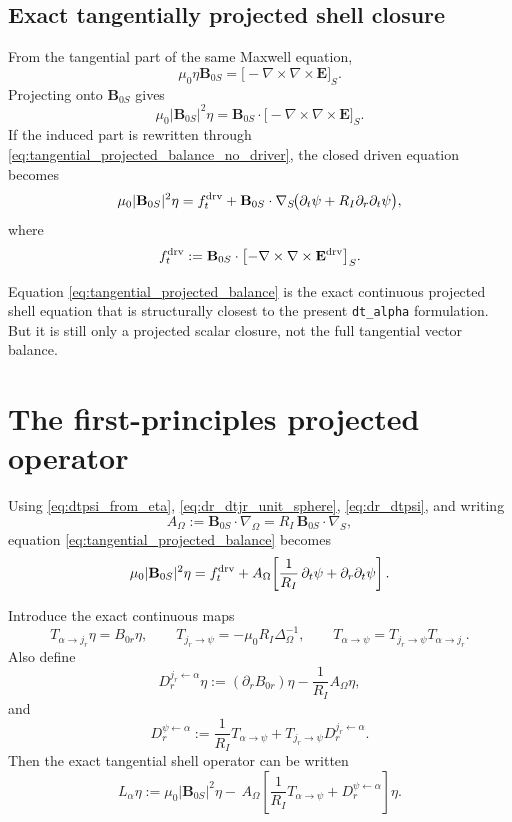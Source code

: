 \documentclass[11pt,a4paper]{article}
\begin{document}
\subsection*{Exact tangentially projected shell closure}

From the tangential part of the same Maxwell equation,
\[
\mu_0 \eta \mathbf B_{0S} = \bigl[-\nabla\times\nabla\times \mathbf E\bigr]_S.
\]
Projecting onto $\mathbf B_{0S}$ gives
\begin{equation}
\mu_0 |\mathbf B_{0S}|^2 \eta
=
\mathbf B_{0S}\cdot \bigl[-\nabla\times\nabla\times \mathbf E\bigr]_S.
\label{eq:tangential_projected_driver}
\end{equation}
If the induced part is rewritten through \eqref{eq:tangential_projected_balance_no_driver},
the closed driven equation becomes
\begin{equation}
\mu_0 |\mathbf B_{0S}|^2 \eta
=
f_t^{\rm drv}
+
\mathbf B_{0S}\cdot \nabla_S\!\bigl(\partial_t\psi + R_I \partial_r\partial_t\psi\bigr),
\label{eq:tangential_projected_balance}
\end{equation}
where
\begin{equation}
f_t^{\rm drv}
:=
\mathbf B_{0S}\cdot \bigl[-\nabla\times\nabla\times \mathbf E^{\rm drv}\bigr]_S.
\label{eq:f_t_drv}
\end{equation}

Equation \eqref{eq:tangential_projected_balance} is the exact continuous
projected shell equation that is structurally closest to the present
\texttt{dt\_alpha} formulation. But it is still only a projected scalar closure,
not the full tangential vector balance.

\section{The first-principles projected operator}

Using \eqref{eq:dtpsi_from_eta}, \eqref{eq:dr_dtjr_unit_sphere},
\eqref{eq:dr_dtpsi}, and writing
\[
A_\Omega := \mathbf B_{0S}\cdot \nabla_\Omega = R_I\,\mathbf B_{0S}\cdot \nabla_S,
\]
equation \eqref{eq:tangential_projected_balance} becomes
\begin{equation}
\mu_0 |\mathbf B_{0S}|^2 \eta
=
f_t^{\rm drv}
+
A_\Omega\!\left[
\frac{1}{R_I}\,\partial_t\psi + \partial_r\partial_t\psi
\right].
\label{eq:code_matching_continuous}
\end{equation}

Introduce the exact continuous maps
\[
T_{\alpha\to j_r}\eta = B_{0r}\eta,
\qquad
T_{j_r\to\psi} = -\mu_0 R_I \Delta_\Omega^{-1},
\qquad
T_{\alpha\to\psi} = T_{j_r\to\psi} T_{\alpha\to j_r}.
\]
Also define
\[
D_r^{j_r\leftarrow\alpha}\eta
:=
(\partial_r B_{0r})\eta - \frac{1}{R_I}A_\Omega \eta,
\]
and
\[
D_r^{\psi\leftarrow\alpha}
:=
\frac{1}{R_I}T_{\alpha\to\psi}
+
T_{j_r\to\psi} D_r^{j_r\leftarrow\alpha}.
\]
Then the exact tangential shell operator can be written
\begin{equation}
L_\alpha \eta
:=
\mu_0 |\mathbf B_{0S}|^2 \eta
-\,
A_\Omega\!\left[
\frac{1}{R_I} T_{\alpha\to\psi}
+
D_r^{\psi\leftarrow\alpha}
\right]\eta.
\label{eq:L_alpha_continuous}
\end{equation}
\end{document}
